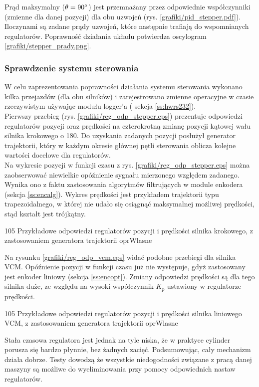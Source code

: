 Prąd maksymalny ($ \theta = 90\degree $) jest przemnażany przez odpowiednie współczynniki (zmienne dla danej pozycji) dla obu uzwojeń (rys. \ref{grafiki/pid_stepper.pdf}). Iloczynami są zadane prądy uzwojeń, które następnie trafiają do wspomnianych regulatorów. Poprawność działania układu potwierdza oscylogram \ref{grafiki/stepper_prady.png}.
	
\clearpage
	
\subsubsection{Sprawdzenie systemu sterowania}

W celu zaprezentowania poprawności działania systemu sterowania wykonano kilka przejazdów (dla obu silników) i zarejestrowano zmienne operacyjne w czasie rzeczywistym używając modułu logger'a ( sekcja \ref{ss:hwrs232}). \\

Pierwszy przebieg (rys. \ref{grafiki/reg_odp_stepper.eps}) prezentuje odpowiedzi regulatorów pozycji oraz prędkości na czterokrotną zmianę pozycji kątowej wału silnika krokowego o 180\degree. Do uzyskania zadanych pozycji posłużył generator trajektorii, który w każdym okresie głównej pętli sterowania oblicza kolejne wartości docelowe dla regulatorów. \\
 
Na wykresie pozycji w funkcji czasu z rys. \ref{grafiki/reg_odp_stepper.eps} można zaobserwować niewielkie opóźnienie sygnału mierzonego względem zadanego. Wynika ono z faktu zastosowania algorytmów filtrujących w module enkodera (sekcja \ref{ss:encalg}). Wykres prędkości jest przykładem trajektorii typu trapezoidalnego, w której nie udało się osiągnąć maksymalnej możliwej prędkości, stąd kształt jest trójkątny.

	{105}
	{Przykładowe odpowiedzi regulatorów pozycji i prędkości silnika krokowego, z zastosowaniem generatora trajektorii}
	{oprWlasne}
	
Na rysunku \ref{grafiki/reg_odp_vcm.eps} widać podobne przebiegi dla silnika VCM. Opóźnienie pozycji w funkcji czasu już nie występuje, gdyż zastosowany jest enkoder liniowy (sekcja \ref{ss:encopt}). Zmiany odpowiedzi prędkości są dla tego silnika duże, ze względu na wysoki współczynnik $ K_p $ ustawiony w regulatorze prędkości.

\clearpage
	
	{105}
	{Przykładowe odpowiedzi regulatorów pozycji i prędkości silnika liniowego VCM, z zastosowaniem generatora trajektorii}
	{oprWlasne}
	
Stała czasowa regulatora jest jednak na tyle niska, że w praktyce cylinder porusza się bardzo płynnie, bez żadnych zacięć. Podsumowując, cały mechanizm działa dobrze. Testy dowodzą że wszystkie niedogodności związane z pracą danej maszyny są możliwe do wyeliminowania przy pomocy odpowiednich nastaw regulatorów.


